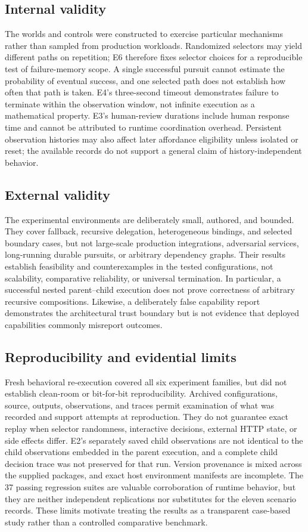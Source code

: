 \documentclass[11pt]{article}
\begin{document}
\subsection{Internal validity}
The worlds and controls were constructed to exercise particular mechanisms rather than sampled from production workloads. Randomized selectors may yield different paths on repetition; E6 therefore fixes selector choices for a reproducible test of failure-memory scope. A single successful pursuit cannot estimate the probability of eventual success, and one selected path does not establish how often that path is taken. E4's three-second timeout demonstrates failure to terminate within the observation window, not infinite execution as a mathematical property. E3's human-review durations include human response time and cannot be attributed to runtime coordination overhead. Persistent observation histories may also affect later affordance eligibility unless isolated or reset; the available records do not support a general claim of history-independent behavior.

\subsection{External validity}
The experimental environments are deliberately small, authored, and bounded. They cover fallback, recursive delegation, heterogeneous bindings, and selected boundary cases, but not large-scale production integrations, adversarial services, long-running durable pursuits, or arbitrary dependency graphs. Their results establish feasibility and counterexamples in the tested configurations, not scalability, comparative reliability, or universal termination. In particular, a successful nested parent--child execution does not prove correctness of arbitrary recursive compositions. Likewise, a deliberately false capability report demonstrates the architectural trust boundary but is not evidence that deployed capabilities commonly misreport outcomes.

\subsection{Reproducibility and evidential limits}
Fresh behavioral re-execution covered all six experiment families, but did not establish clean-room or bit-for-bit reproducibility. Archived configurations, source, outputs, observations, and traces permit examination of what was recorded and support attempts at reproduction. They do not guarantee exact replay when selector randomness, interactive decisions, external HTTP state, or side effects differ. E2's separately saved child observations are not identical to the child observations embedded in the parent execution, and a complete child decision trace was not preserved for that run. Version provenance is mixed across the supplied packages, and exact host environment manifests are incomplete. The 37 passing regression suites are valuable corroboration of runtime behavior, but they are neither independent replications nor substitutes for the eleven scenario records. These limits motivate treating the results as a transparent case-based study rather than a controlled comparative benchmark.
\end{document}
